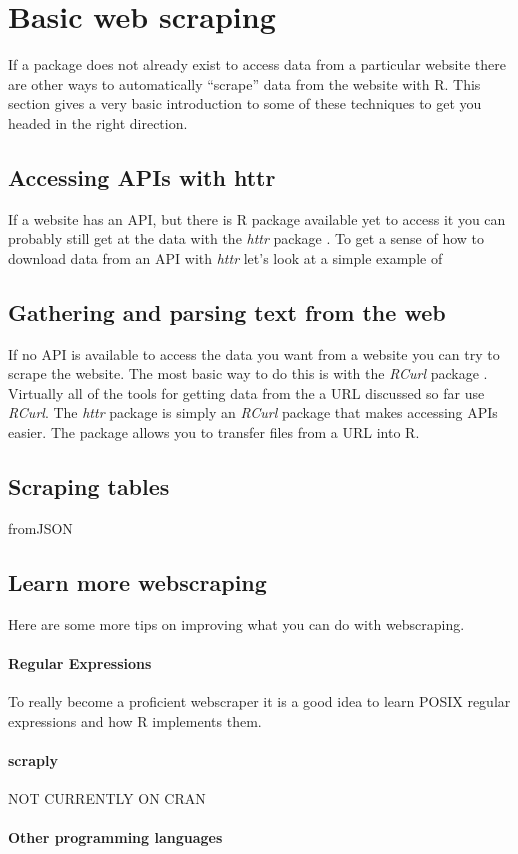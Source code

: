 \section{Basic web scraping}

If a package does not already exist to access data from a particular website there are other ways to automatically ``scrape'' data from the website with R. This section gives a very basic introduction to some of these techniques to get you headed in the right direction.

\subsection{Accessing APIs with httr}

If a website has an API, but there is R package available yet to access it you can probably still get at the data with the \emph{httr} package \citep{R-httr}. To get a sense of how to download data from an API with \emph{httr} let's look at a simple example of 

\subsection{Gathering and parsing text from the web}

If no API is available to access the data you want from a website you can try to scrape the website. The most basic way to do this is with the \emph{RCurl} package \citep{R-RCurl}. Virtually all of the tools for getting data from the a URL discussed so far use \emph{RCurl}. The \emph{httr} package is simply an \emph{RCurl} package that makes accessing APIs easier. The package allows you to transfer files from a URL into R.  

\subsection{Scraping tables}

fromJSON

\subsection{Learn more webscraping}

Here are some more tips on improving what you can do with webscraping.

\paragraph{Regular Expressions} 

To really become a proficient webscraper it is a good idea to learn POSIX regular expressions and how R implements them.



\paragraph{scraply}  NOT CURRENTLY ON CRAN

\paragraph{Other programming languages}


